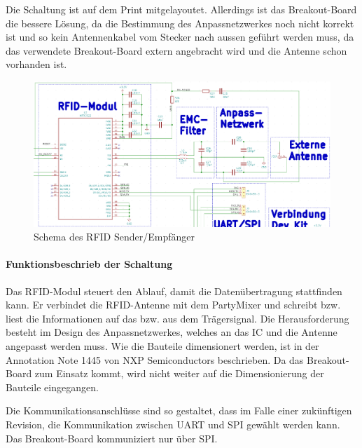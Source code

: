 Die Schaltung ist auf dem Print mitgelayoutet. Allerdings ist das Breakout-Board die bessere Lösung, da die Bestimmung des Anpassnetzwerkes noch nicht korrekt ist und so kein Antennenkabel vom Stecker nach aussen geführt werden muss, da das verwendete Breakout-Board extern angebracht wird und die Antenne schon vorhanden ist.

\begin{figure}[H]
\center
\includegraphics[width = \textwidth]{graphics/Schema_RFID}
\caption{Schema des RFID Sender/Empfänger}
\label{fig:Schema_RFID}
\end{figure}

\paragraph{Funktionsbeschrieb der Schaltung}\mbox{}

Das RFID-Modul steuert den Ablauf, damit die Datenübertragung stattfinden kann. Er verbindet die RFID-Antenne mit dem PartyMixer und schreibt bzw. liest die Informationen auf das bzw. aus dem Trägersignal. Die Herausforderung besteht im Design des Anpassnetzwerkes, welches an das IC und die Antenne angepasst werden muss. Wie die Bauteile dimensionert werden, ist in der Annotation Note 1445 von NXP Semiconductors beschrieben. Da das Breakout-Board zum Einsatz kommt, wird nicht weiter auf die Dimensionierung der Bauteile eingegangen.

Die Kommunikationsanschlüsse sind so gestaltet, dass im Falle einer zukünftigen Revision, die Kommunikation zwischen UART und SPI gewählt werden kann. Das Breakout-Board kommuniziert nur über SPI.
